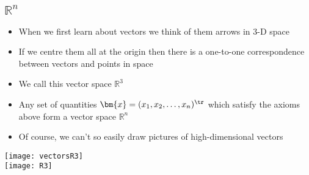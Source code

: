 
\begin{slide}
\section[-1]{$\mathbb{R}^n$}

\begin{PauseHighLight}
  \begin{minipage}{0.8\linewidth}
    \begin{itemize}
    \item When we first learn about vectors we think of them arrows in 3-D
      space\pause
    \item If we centre them all at the origin then there is a one-to-one
      correspondence between vectors and points in space\pause
    \item We call this vector space $\mathbb{R}^3$\pause
    \item Any set of quantities $\bm{x} = (x_1, x_2, \ldots,
      x_n)^\tr$ which satisfy the axioms above form a vector space
      $\mathbb{R}^n$\pause
    \item Of course, we can't so easily draw pictures of
      high-dimensional vectors\pause
    \end{itemize}
  \end{minipage}
  \begin{minipage}{0.18\linewidth}
    \begin{center}
      \texttt{[image: vectorsR3]}\\
      \texttt{[image: R3]}
    \end{center}
  \end{minipage}
\end{PauseHighLight}


\end{slide}



